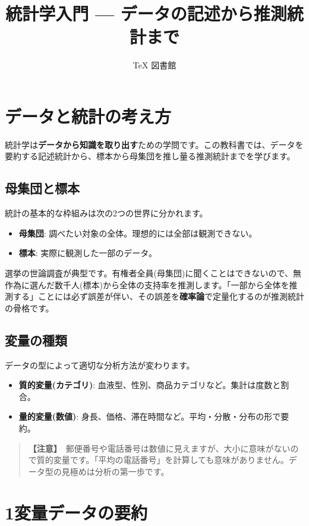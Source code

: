 \documentclass{article}
\title{統計学入門 — データの記述から推測統計まで}
\author{TeX 図書館}
\begin{document}
\section{データと統計の考え方}

統計学は\textbf{データから知識を取り出す}ための学問です。この教科書では、データを要約する記述統計から、標本から母集団を推し量る推測統計までを学びます。

\subsection{母集団と標本}

統計の基本的な枠組みは次の2つの世界に分かれます。

\begin{itemize}
\item \textbf{母集団}: 調べたい対象の全体。理想的には全部は観測できない。
\item \textbf{標本}: 実際に観測した一部のデータ。
\end{itemize}

選挙の世論調査が典型です。有権者全員(母集団)に聞くことはできないので、無作為に選んだ数千人(標本)から全体の支持率を推測します。「一部から全体を推測する」ことには必ず誤差が伴い、その誤差を\textbf{確率論}で定量化するのが推測統計の骨格です。

\subsection{変量の種類}

データの型によって適切な分析方法が変わります。
\begin{itemize}
\item \textbf{質的変量(カテゴリ)}: 血液型、性別、商品カテゴリなど。集計は度数と割合。
\item \textbf{量的変量(数値)}: 身長、価格、滞在時間など。平均・分散・分布の形で要約。
\end{itemize}

\begin{quote}
\textbf{【注意】}\ 郵便番号や電話番号は数値に見えますが、大小に意味がないので質的変量です。「平均の電話番号」を計算しても意味がありません。データ型の見極めは分析の第一歩です。
\end{quote}

\section{1変量データの要約}
\end{document}
